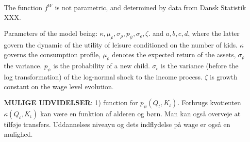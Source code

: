 The function $f^{W}$ is not parametric, and determined by data from Dansk Statistik XXX.


Parameters of the model being: $\kappa, \mu_\rho, \sigma_\rho, p_\psi, \sigma_\epsilon, \zeta$. and $a, b, c, d$, where the latter govern the dynamic of the utility of leisure conditioned on the number of kids. $\kappa$ governs the consumption profile, $\mu_\rho$ denotes the expected return of the assets, $\sigma_\rho$ the variance. $p_\psi$ is the probability of a new child. $\sigma_{\epsilon}$ is the variance (before the log transformation) of the log-normal shock to the income process. $\zeta$ is growth constant on the wage level evolution.


\textbf{MULIGE UDVIDELSER}: 1) function for $p_\psi (Q_t, K_t)$.  Forbrugs kvotienten $\kappa (Q_t, K_t)$ kan være en funktion af alderen og børn. Man kan også overveje at tilføje transfers. Uddannelses niveayu og dets indflydelse på wage er også en mulighed.
